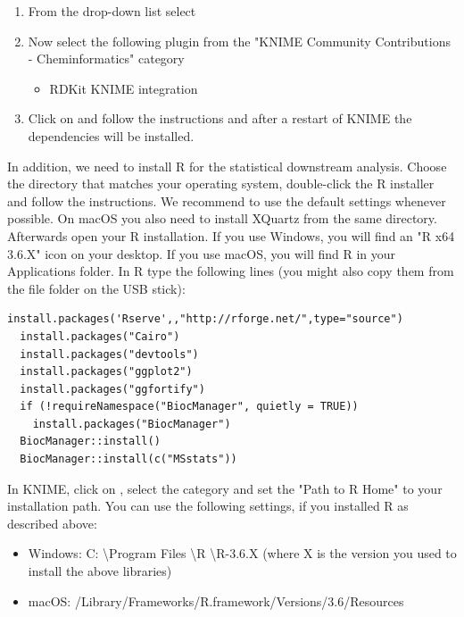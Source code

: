 \begin{enumerate}
\item From the  drop-down list select \\\menu{\KnimeTrustedSite}
\item Now select the following plugin from the "KNIME Community Contributions - Cheminformatics" category 	
    \begin{itemize}
    \item     RDKit KNIME integration
    \end{itemize}	
\item Click on  and follow the instructions and after a restart of KNIME the dependencies will be installed.
\end{enumerate}


\noindent In addition, we need to install R for the statistical downstream analysis. Choose the directory that matches your operating system, double-click the R installer and follow the instructions. We recommend to use the default settings whenever possible. On macOS you also need to install XQuartz from the same directory.\\

\noindent Afterwards open your R installation. If you use Windows, you will find an "R x64 3.6.X" icon on your desktop. If you use macOS, you will find R in your Applications folder. In R type the following lines (you might also copy them from the file  folder on the USB stick):
\begin{lstlisting}[aboveskip=8pt]
  install.packages('Rserve',,"http://rforge.net/",type="source")
  install.packages("Cairo")
  install.packages("devtools")
  install.packages("ggplot2")
  install.packages("ggfortify")
  if (!requireNamespace("BiocManager", quietly = TRUE))
	install.packages("BiocManager")
  BiocManager::install()
  BiocManager::install(c("MSstats"))
\end{lstlisting}

\noindent In KNIME, click on , select the category  and set the "Path to R Home" to your installation path. You can use the following settings, if you installed R as described above:
\begin{itemize}
\item Windows: C: \textbackslash Program Files \textbackslash R \textbackslash R-3.6.X (where X is the version you used to install the above libraries)
\item macOS: /Library/Frameworks/R.framework/Versions/3.6/Resources 
\end{itemize}

